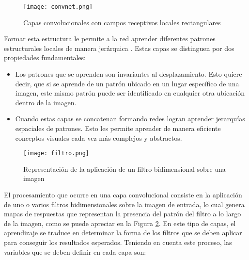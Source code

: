 \begin{figure}[H]
  \centering{}
  \texttt{[image: convnet.png]}
  \caption{Capas convolucionales con campos receptivos locales rectangulares}
  \label{fig:convnet}
\end{figure}

Formar esta estructura le permite a la red aprender diferentes patrones estructurales locales de manera jerárquica \cite{lagartija}. Estas capas se distinguen por dos propiedades fundamentales: 

\begin{itemize}
\item Los patrones que se aprenden son invariantes al desplazamiento. Esto quiere decir, que si se aprende de un patrón ubicado en un lugar específico de una imagen, este mismo patrón puede ser identificado en cualquier otra ubicación dentro de la imagen. 

\item Cuando estas capas se concatenan formando redes logran aprender jerarquías espaciales de patrones. Esto les permite aprender de manera eficiente conceptos visuales cada vez más complejos y abstractos. 
\end{itemize}

\begin{figure}[H]
  \centering{}
  \texttt{[image: filtro.png]}
  \caption{Representación de la aplicación de un filtro bidimensional sobre una imagen}
  \label{fig:numerito}
\end{figure}

El procesamiento que ocurre en una capa convolucional consiste en la aplicación de uno o varios filtros bidimensionales sobre la imagen de entrada, lo cual genera mapas de respuestas que representan la presencia del patrón del filtro a lo largo de la imagen, como se puede apreciar en la Figura \ref{fig:numerito}. En este tipo de capas, el aprendizaje se traduce en determinar la forma de los filtros que se deben aplicar para conseguir los resultados esperados. Teniendo en cuenta este proceso, las variables que se deben definir en cada capa son: 

